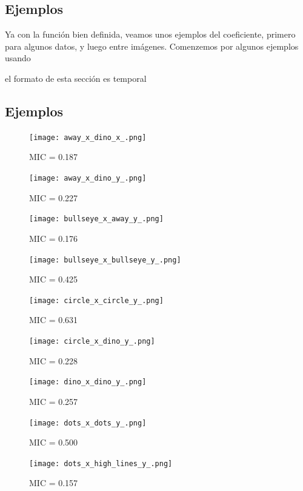 	\subsection{Ejemplos}
	Ya con la funci\'on bien definida, veamos unos ejemplos del coeficiente, primero para algunos datos, y luego entre im\'agenes. Comenzemos por algunos ejemplos usando 

	el formato de esta secci\'on es temporal
	\subsection[]{Ejemplos}
	\begin{figure}[H]
		\centering
		\texttt{[image: away\_x\_dino\_x\_.png]}
		\caption{ MIC = 0.187}
		\end{figure}
		
		\begin{figure}[H]
		\centering
		\texttt{[image: away\_x\_dino\_y\_.png]}
		\caption{ MIC = 0.227}
		\end{figure}
		
		\begin{figure}[H]
		\centering
		\texttt{[image: bullseye\_x\_away\_y\_.png]}
		\caption{ MIC = 0.176}
		\end{figure}
		
		\begin{figure}[H]
		\centering
		\texttt{[image: bullseye\_x\_bullseye\_y\_.png]}
		\caption{ MIC = 0.425}
		\end{figure}
		
		\begin{figure}[H]
		\centering
		\texttt{[image: circle\_x\_circle\_y\_.png]}
		\caption{ MIC = 0.631}
		\end{figure}
		
		\begin{figure}[H]
		\centering
		\texttt{[image: circle\_x\_dino\_y\_.png]}
		\caption{ MIC = 0.228}
		\end{figure}
		
		\begin{figure}[H]
		\centering
		\texttt{[image: dino\_x\_dino\_y\_.png]}
		\caption{ MIC = 0.257}
		\end{figure}
		
		\begin{figure}[H]
		\centering
		\texttt{[image: dots\_x\_dots\_y\_.png]}
		\caption{ MIC = 0.500}
		\end{figure}
		
		\begin{figure}[H]
		\centering
		\texttt{[image: dots\_x\_high\_lines\_y\_.png]}
		\caption{ MIC = 0.157}
		\end{figure}
		
